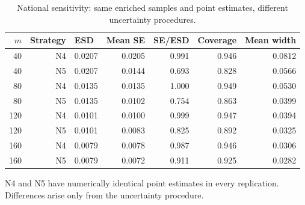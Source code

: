 \begin{table}[h!]
\centering
\small
\caption{National sensitivity: same enriched samples and point estimates, different uncertainty procedures.}
\label{tab:nav-variance-comparison}
\begin{tabular}{rrlrrrr}
\toprule
$m$ & Strategy & ESD & Mean SE & SE/ESD & Coverage & Mean width \\
\midrule
40 & N4 & 0.0207 & 0.0205 & 0.991 & 0.946 & 0.0812 \\
40 & N5 & 0.0207 & 0.0144 & 0.693 & 0.828 & 0.0566 \\
80 & N4 & 0.0135 & 0.0135 & 1.000 & 0.949 & 0.0530 \\
80 & N5 & 0.0135 & 0.0102 & 0.754 & 0.863 & 0.0399 \\
120 & N4 & 0.0101 & 0.0100 & 0.999 & 0.947 & 0.0394 \\
120 & N5 & 0.0101 & 0.0083 & 0.825 & 0.892 & 0.0325 \\
160 & N4 & 0.0079 & 0.0078 & 0.987 & 0.946 & 0.0306 \\
160 & N5 & 0.0079 & 0.0072 & 0.911 & 0.925 & 0.0282 \\
\bottomrule
\end{tabular}
\par\vspace{2pt}
\begin{minipage}{0.97\linewidth}\footnotesize N4 and N5 have numerically identical point estimates in every replication. Differences arise only from the uncertainty procedure.\end{minipage}
\end{table}

